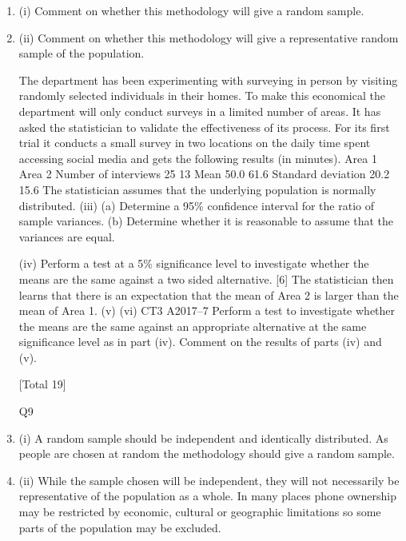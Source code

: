 \documentclass[a4paper,12pt]{article}
\begin{document}
\begin{enumerate}
[Total 20]
9
A statistician is examining the survey methodology of a country’s national statistics
department. It conducts much of its data collection by telephoning individuals
selected at random and asking them questions.
\item (i) Comment on whether this methodology will give a random sample.

\item (ii) Comment on whether this methodology will give a representative random
sample of the population.

The department has been experimenting with surveying in person by visiting
randomly selected individuals in their homes. To make this economical the
department will only conduct surveys in a limited number of areas. It has asked the
statistician to validate the effectiveness of its process.
For its first trial it conducts a small survey in two locations on the daily time spent
accessing social media and gets the following results (in minutes).
Area 1
Area 2
Number of
interviews
25
13
Mean
50.0
61.6
Standard
deviation
20.2
15.6
The statistician assumes that the underlying population is normally distributed.
(iii)
(a) Determine a 95\% confidence interval for the ratio of sample variances.
(b) Determine whether it is reasonable to assume that the variances are
equal.

(iv)
Perform a test at a 5\% significance level to investigate whether the means are
the same against a two sided alternative.
[6]
The statistician then learns that there is an expectation that the mean of Area 2 is
larger than the mean of Area 1.
(v)
(vi)
CT3 A2017–7
Perform a test to investigate whether the means are the same against an
appropriate alternative at the same significance level as in part (iv).
Comment on the results of parts (iv) and (v).


[Total 19]

Q9
\item (i) A random sample should be independent and identically distributed. As
people are chosen at random the methodology should give a random sample.

\item (ii) While the sample chosen will be independent, they will not necessarily be
representative of the population as a whole. In many places phone ownership
may be restricted by economic, cultural or geographic limitations so some
parts of the population may be excluded.


\end{enumerate}
\end{document}
